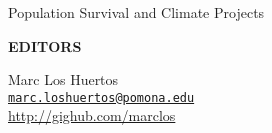\documentclass[10pt,final,hyphenatedtitles]{papertex}\usepackage[]{graphicx}\usepackage[]{color}
\begin{document}
\begin{frontpage}
\begin{weatherblock}{Population Survival and Climate Projects}
\end{weatherblock}

\begin{authorblock}
\textbf{EDITORS}

Marc Los Huertos\\
\href{mailto:marc.loshuertos@pomona.edu}{\texttt{marc.loshuertos@pomona.edu}}\\[5pt]
\href{http://github.com/marclos}{http://gighub.com/marclos}\\
\end{authorblock}

\end{frontpage}

\end{document}
